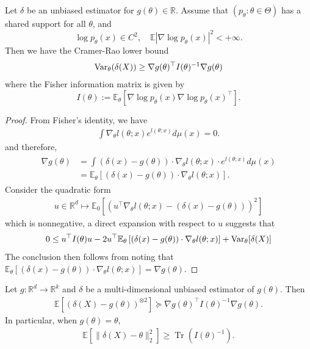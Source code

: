 \begin{thm}    
Let $\delta$ be an unbiased estimator for $g(\theta) \in \mathbb{R}$. Assume that $(p_\theta: \theta \in \Theta)$ has a shared support for all $\theta$, and 
$$
\log p_\theta(x) \in C^2, \quad \mathbb{E}\left|\nabla \log p_\theta(x)\right|^2<+\infty.
$$
Then we have the Cramer-Rao lower bound
\begin{align*}
\operatorname{Var}_\theta(\delta(X)) \geq \nabla g(\theta)^{\top} I(\theta)^{-1} \nabla g(\theta)
\end{align*}
where the Fisher information matrix is given by
$$I(\theta):=\mathbb{E}_\theta\left[\nabla \log p_\theta(x) \nabla \log p_\theta(x)^{\top}\right].$$
\end{thm}

\begin{proof}
From Fisher's identity, we have
\begin{align*}
\int \nabla_\theta l(\theta ; x) e^{l (\theta ; x)} d \mu(x)=0 .
\end{align*}
and therefore,
\begin{align*}
\begin{aligned}
\nabla g(\theta) & =\int(\delta(x)-g(\theta)) \cdot \nabla_\theta l(\theta ; x) \cdot e^{l(\theta ; x)} d \mu(x) \\
& =\mathbb{E}_\theta\left[(\delta(x)-g(\theta)) \cdot \nabla_\theta l(\theta ; x)\right] .
\end{aligned}
\end{align*}
Consider the quadratic form
\begin{align*}
u \in \mathbb{R}^d \mapsto \mathbb{E}_0\left[\left(u^{\top} \nabla_\theta l(\theta ; x)-(\delta(x)-g(\theta))\right)^2\right] 
\end{align*}
which is nonnegative, a direct expansion with respect to $u$ suggests that
\begin{align*}
0 \leq u^{\top} I(\theta) u-2 u^{\top} \mathbb{E}_\theta\left[(\delta(x)-g(\theta)) \cdot \nabla_\theta l(\theta ; x)\right]+\operatorname{Var}_\theta[\delta(X)]
\end{align*}
The conclusion then follows from noting that $\mathbb{E}_\theta\left[(\delta(x)-g(\theta)) \cdot \nabla_\theta l(\theta ; x)\right]=\nabla g(\theta)$.
\end{proof}

\begin{cor}
Let $g: \mathbb{R}^d \rightarrow \mathbb{R}^k$ and $\delta$ be a multi-dimensional unbiased estimator of $g(\theta)$. Then
\begin{align*}
\mathbb{E}\left[(\delta(X)-g(\theta))^{\otimes 2}\right]  \succeq\nabla g(\theta)^{\top} I(\theta)^{-1} \nabla g(\theta).
\end{align*}
In particular, when $g(\theta)=\theta$,
\begin{align*}
\mathbb{E}\left[\|\delta(X)-\theta \|_2^2\right] \geq \operatorname{Tr}\left(I(\theta)^{-1}\right) .
\end{align*}
\end{cor}

